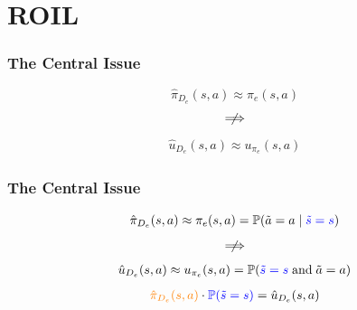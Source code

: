 \documentclass{beamer}
\begin{document}


\section*{ROIL}

\begin{frame}
\frametitle{The Central Issue}
\[
	\hat{\pi}_{D_e}(s, a) \approx \pi_e(s, a)
\]
\vfill
\[
	\centernot\implies
\]
\vfill
\begin{align*}
	\hat{u}_{D_e}(s, a) \approx u_{\pi_e}(s, a)
\end{align*}
\end{frame}

\begin{frame}
\frametitle{The Central Issue}
\[
	\hat{\pi}_{D_e}(s, a) \approx \pi_e(s, a) = \mathbb{P}(\tilde{a} = a \mid \textcolor{blue}{\tilde{s} = s})
\]
\vfill
\[
	\centernot\implies
\]
\vfill
\begin{align*}
	\hat{u}_{D_e}(s,a) \approx u_{\pi_e}(s,a) = \mathbb{P}(\textcolor{blue}{\tilde{s} = s} \;\text{and}\; \tilde{a} = a)
\end{align*}
\vfill
\begin{align*}
	\textcolor{orange}{\hat{\pi}_{D_e}(s, a)} \cdot \textcolor{blue}{\mathbb{P}(\tilde{s} = s)} = \hat{u}_{D_e}(s,a)
\end{align*}
\end{frame}
\end{document}
